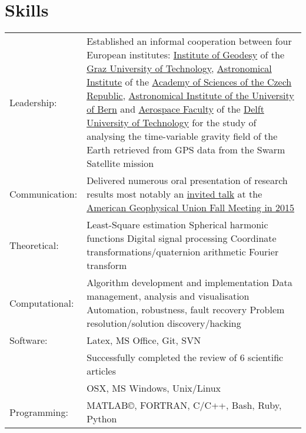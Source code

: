 \documentclass[a4paper]{article}
\newcommand{\procv}[2]{\iftoggle{professionalcv}{#1}{#2}}
\newenvironment{cvsection}[2]{
  \vspace{0.2in}
  \section*{#1}
  \vspace{-0.2in}
  \begin{longtable}{lp{#2}}
}{
  \end{longtable}
}
\begin{document}
\begin{cvsection}{Skills}{11.2cm}
Leadership: & Established an informal cooperation between four European institutes:\newline
  \href{http://www.itsg.tugraz.at}{Institute of Geodesy} of the \href{http://www.tugraz.at}{Graz University of Technology},\newline
  \href{http://www.asu.cas.cz/en}{Astronomical Institute} of the \href{http://www.cas.cz/index.html}{Academy of Sciences of the Czech Republic},\newline
  \href{http://www.aiub.unibe.ch}{Astronomical Institute of the University of Bern} and\newline
  \href{http://www.lr.tudelft.nl}{Aerospace Faculty} of the \href{http://www.tudelft.nl}{Delft University of Technology}\newline
  for the study of analysing the time-variable gravity field of the Earth retrieved from GPS data from the Swarm Satellite mission\\[0.2cm]

Communication:  & Delivered numerous oral presentation of research results\newline
                  most notably an \href{http://agu.confex.com/agu/fm15/meetingapp.cgi/Paper/71877}{invited talk} at the \href{http://fallmeeting.agu.org/2015/}{American Geophysical Union Fall Meeting in 2015}\\[0.2cm]

Theoretical:   & Least-Square estimation\newline
                 Spherical harmonic functions\newline
                 Digital signal processing\newline
                 Coordinate transformations\slash quaternion arithmetic\newline
                 Fourier transform\\[0.2cm]

Computational:  & Algorithm development and implementation\newline
                  Data management, analysis and visualisation\newline
                  Automation, robustness, fault recovery\newline
                  Problem resolution\slash solution discovery\slash hacking\\[0.2cm]
Software: & Latex, MS Office, Git, SVN\\[0.2cm]
\procv{}{
Articles review: & Successfully completed the review of 6 scientific articles\\[0.2cm]
}

Operating Systems: & OSX, MS Windows, Unix/Linux \\[0.2cm]

Programming:  & MATLAB\copyright, FORTRAN, C/C++, Bash, Ruby, Python \\[0.2cm]
\end{cvsection}
\end{document}
